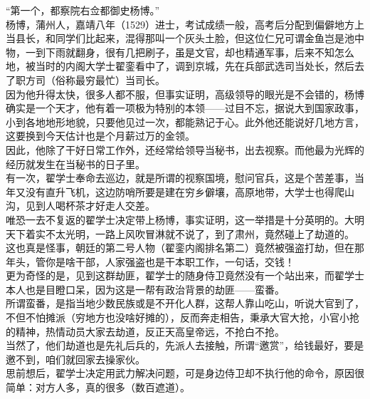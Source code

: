 \begin{multicols}{\theparacolNo}
“第一个，都察院右佥都御史杨博。”\\

杨博，蒲州人，嘉靖八年（1529）进士，考试成绩一般，高考后分配到偏僻地方上当县长，和同学们比起来，混得那叫一个灰头土脸，但这位仁兄可谓金鱼岂是池中物，一到下雨就翻身，很有几把刷子，虽是文官，却也精通军事，后来不知怎么地，被当时的内阁大学士翟銮看中了，调到京城，先在兵部武选司当处长，然后去了职方司（俗称最穷最忙）当司长。\\

因为他升得太快，很多人都不服，但事实证明，高级领导的眼光是不会错的，杨博确实是一个天才，他有着一项极为特别的本领——过目不忘，据说大到国家政事，小到各地地形地貌，只要他见过一次，都能熟记于心。此外他还能说好几地方言，这要换到今天估计也是个月薪过万的金领。\\

因此，他除了干好日常工作外，还经常给领导当秘书，出去视察。而他最为光辉的经历就发生在当秘书的日子里。\\

有一次，翟学士奉命去巡边，就是所谓的视察国境，慰问官兵，这是个苦差事，当年又没有直升飞机，这边防哨所要是建在穷乡僻壤，高原地带，大学士也得爬山沟，见到人喝杯茶才好走人交差。\\

唯恐一去不复返的翟学士决定带上杨博，事实证明，这一举措是十分英明的。大明天下着实不太光明，一路上风吹冒淋就不说了，到了肃州，竟然碰上了劫道的。\\

这也真是怪事，朝廷的第二号人物（翟銮内阁排名第二）竟然被强盗打劫，但在那年头，管你是啥干部，人家强盗也是干本职工作，一句话，交钱！\\

更为奇怪的是，见到这群劫匪，翟学士的随身侍卫竟然没有一个站出来，而翟学士本人也是目瞪口呆，因为这是一帮有政治背景的劫匪——蛮番。\\

所谓蛮番，是指当地少数民族或是不开化人群，这帮人靠山吃山，听说大官到了，不但不怕摊派（穷地方也没啥好摊的），反而奔走相告，秉承大官大抢，小官小抢的精神，热情动员大家去劫道，反正天高皇帝远，不抢白不抢。\\

当然了，他们劫道也是先礼后兵的，先派人去接触，所谓“邀赏”，给钱最好，要是邀不到，咱们就回家去操家伙。\\

思前想后，翟学士决定用武力解决问题，可是身边侍卫却不执行他的命令，原因很简单：对方人多，真的很多（数百遮道）。\\


\end{multicols}
